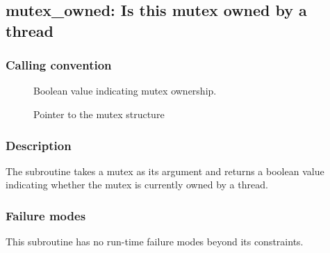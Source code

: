 \clearpage
{}
{}
\label{subr:mutex_owned}
\subsection*{mutex\_owned: Is this mutex owned by a thread}

\subsubsection*{Calling convention}

\begin{description}
\item[] Boolean value indicating mutex ownership.
\item[] Pointer to the mutex structure
\end{description}

\subsubsection*{Description}

The  subroutine takes a mutex as its argument
and returns a boolean value indicating whether the mutex is currently
owned by a thread.

\subsubsection*{Failure modes}

This subroutine has no run-time failure modes beyond its constraints.
